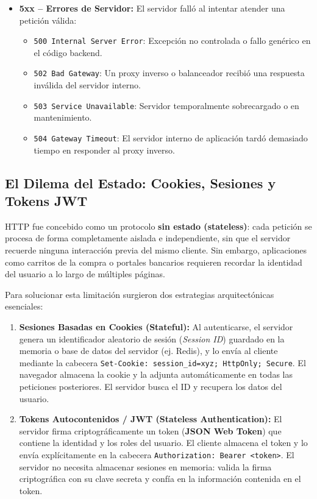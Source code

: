 \begin{itemize}[leftmargin=1.2cm]
\begin{itemize}
    \end{itemize}
  \item \textbf{5xx -- Errores de Servidor:} El servidor falló al intentar atender una petición válida:
    \begin{itemize}
      \item \texttt{500 Internal Server Error}: Excepción no controlada o fallo genérico en el código backend.
      \item \texttt{502 Bad Gateway}: Un proxy inverso o balanceador recibió una respuesta inválida del servidor interno.
      \item \texttt{503 Service Unavailable}: Servidor temporalmente sobrecargado o en mantenimiento.
      \item \texttt{504 Gateway Timeout}: El servidor interno de aplicación tardó demasiado tiempo en responder al proxy inverso.
    \end{itemize}
\end{itemize}

\subsection{El Dilema del Estado: Cookies, Sesiones y Tokens JWT}

HTTP fue concebido como un protocolo \textbf{sin estado (stateless)}: cada petición se procesa de forma completamente aislada e independiente, sin que el servidor recuerde ninguna interacción previa del mismo cliente. Sin embargo, aplicaciones como carritos de la compra o portales bancarios requieren recordar la identidad del usuario a lo largo de múltiples páginas.

Para solucionar esta limitación surgieron dos estrategias arquitectónicas esenciales:
\begin{enumerate}
  \item \textbf{Sesiones Basadas en Cookies (Stateful):} Al autenticarse, el servidor genera un identificador aleatorio de sesión (\textit{Session ID}) guardado en la memoria o base de datos del servidor (ej. Redis), y lo envía al cliente mediante la cabecera \texttt{Set-Cookie: session\_id=xyz; HttpOnly; Secure}. El navegador almacena la cookie y la adjunta automáticamente en todas las peticiones posteriores. El servidor busca el ID y recupera los datos del usuario.
  \item \textbf{Tokens Autocontenidos / JWT (Stateless Authentication):} El servidor firma criptográficamente un token (\textbf{JSON Web Token}) que contiene la identidad y los roles del usuario. El cliente almacena el token y lo envía explícitamente en la cabecera \texttt{Authorization: Bearer <token>}. El servidor no necesita almacenar sesiones en memoria: valida la firma criptográfica con su clave secreta y confía en la información contenida en el token.
\end{enumerate}
